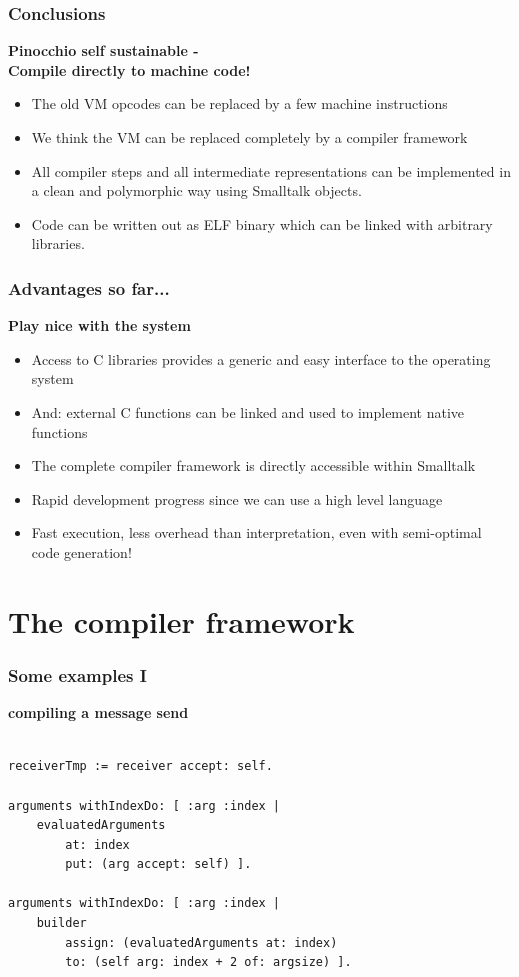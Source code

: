 \documentclass{beamer}
\begin{document}
\begin{frame}[fragile]
    \frametitle{Conclusions}
    {\bf Pinocchio self sustainable - \\Compile directly to machine code!}
    \begin{itemize}
        \item The old VM opcodes can be replaced by a few machine instructions
        \item We think the VM can be replaced completely by a compiler framework
        \item All compiler steps and all intermediate representations can 
            be implemented in a clean and polymorphic way using Smalltalk objects.
        \item Code can be written out as ELF binary which can be linked with
            arbitrary libraries.
    \end{itemize}
\end{frame}

\begin{frame}[fragile]
    \frametitle{Advantages so far...}
    {\bf Play nice with the system}
    \begin{itemize}
        \item Access to C libraries provides a generic and easy interface to the operating system
        \item And: external C functions can be linked and used to implement native functions
        \item The complete compiler framework is directly accessible within Smalltalk
        \item Rapid development progress since we can use a high level language
        \item Fast execution, less overhead than interpretation, even with semi-optimal code generation!
    \end{itemize}
\end{frame}

\section{The compiler framework}

\lstset{language=Smalltalk}

\begin{frame}[fragile]
    \frametitle{Some examples I}
    {\bf compiling a message send}
    \begin{lstlisting}

receiverTmp := receiver accept: self.
    
arguments withIndexDo: [ :arg :index |
    evaluatedArguments 
        at: index 
        put: (arg accept: self) ].
    
arguments withIndexDo: [ :arg :index |
    builder
        assign: (evaluatedArguments at: index)
        to: (self arg: index + 2 of: argsize) ].
    \end{lstlisting}
\end{frame}
\end{document}
